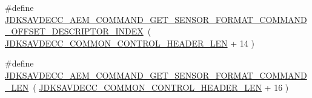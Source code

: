\begin{DoxyCompactItemize}
\item 
\#define \hyperlink{group__command__get__sensor__format_ga8a097caac72c74d48dd15968d713fc6a}{J\+D\+K\+S\+A\+V\+D\+E\+C\+C\+\_\+\+A\+E\+M\+\_\+\+C\+O\+M\+M\+A\+N\+D\+\_\+\+G\+E\+T\+\_\+\+S\+E\+N\+S\+O\+R\+\_\+\+F\+O\+R\+M\+A\+T\+\_\+\+C\+O\+M\+M\+A\+N\+D\+\_\+\+O\+F\+F\+S\+E\+T\+\_\+\+D\+E\+S\+C\+R\+I\+P\+T\+O\+R\+\_\+\+I\+N\+D\+EX}~( \hyperlink{group__jdksavdecc__avtp__common__control__header_gaae84052886fb1bb42f3bc5f85b741dff}{J\+D\+K\+S\+A\+V\+D\+E\+C\+C\+\_\+\+C\+O\+M\+M\+O\+N\+\_\+\+C\+O\+N\+T\+R\+O\+L\+\_\+\+H\+E\+A\+D\+E\+R\+\_\+\+L\+EN} + 14 )
\item 
\#define \hyperlink{group__command__get__sensor__format_ga7a7efac91cd569832df1bb3ea85b360a}{J\+D\+K\+S\+A\+V\+D\+E\+C\+C\+\_\+\+A\+E\+M\+\_\+\+C\+O\+M\+M\+A\+N\+D\+\_\+\+G\+E\+T\+\_\+\+S\+E\+N\+S\+O\+R\+\_\+\+F\+O\+R\+M\+A\+T\+\_\+\+C\+O\+M\+M\+A\+N\+D\+\_\+\+L\+EN}~( \hyperlink{group__jdksavdecc__avtp__common__control__header_gaae84052886fb1bb42f3bc5f85b741dff}{J\+D\+K\+S\+A\+V\+D\+E\+C\+C\+\_\+\+C\+O\+M\+M\+O\+N\+\_\+\+C\+O\+N\+T\+R\+O\+L\+\_\+\+H\+E\+A\+D\+E\+R\+\_\+\+L\+EN} + 16 )
\end{DoxyCompactItemize}
